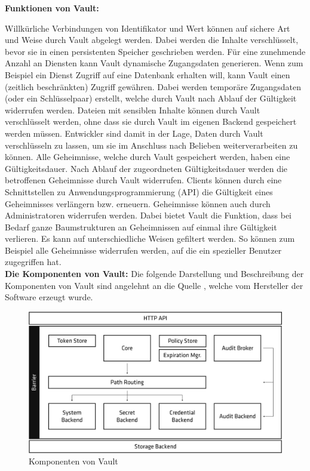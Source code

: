 \documentclass[
book,
a4paper,   
titlepage,  
halfparskip,
12pt        
]{scrartcl}
\begin{document}
\begin{onehalfspacing}
\textbf{Funktionen von Vault:}

Willkürliche Verbindungen von Identifikator und Wert können auf sichere Art und Weise durch Vault abgelegt werden. Dabei werden die Inhalte verschlüsselt, bevor sie in einen persistenten Speicher geschrieben werden.
Für eine zunehmende Anzahl an Diensten kann Vault dynamische Zugangsdaten generieren. Wenn zum Beispiel ein Dienst Zugriff auf eine Datenbank erhalten will, kann Vault einen (zeitlich beschränkten) Zugriff gewähren. Dabei werden temporäre Zugangsdaten (oder ein Schlüsselpaar) erstellt, welche durch Vault nach Ablauf der Gültigkeit widerrufen werden.
Dateien mit sensiblen Inhalte können durch Vault verschlüsselt werden, ohne dass sie durch Vault im eigenen Backend gespeichert werden müssen. Entwickler sind damit in der Lage, Daten durch Vault verschlüsseln zu lassen, um sie im Anschluss nach Belieben weiterverarbeiten zu können.\cite{vaultintro}\newline
Alle Geheimnisse, welche durch Vault gespeichert werden, haben eine Gültigkeitsdauer. Nach Ablauf der zugeordneten Gültigkeitsdauer werden die betroffenen Geheimnisse durch Vault widerrufen. Clients können durch eine Schnittstellen zu Anwendungsprogrammierung (API) die Gültigkeit eines Geheimnisses verlängern bzw. erneuern.
Geheimnisse können auch durch Administratoren widerrufen werden. Dabei bietet Vault die Funktion, dass bei Bedarf ganze Baumstrukturen an Geheimnissen auf einmal ihre Gültigkeit verlieren. Es kann auf unterschiedliche Weisen gefiltert werden. So können zum Beispiel alle Geheimnisse widerrufen werden, auf die ein spezieller Benutzer zugegriffen hat.\cite{vaultintro}\\

\textbf{Die Komponenten von Vault:}
Die folgende Darstellung und Beschreibung der Komponenten von Vault sind angelehnt an die Quelle \cite{vault}, welche vom Hersteller der Software erzeugt wurde. 

\begin{figure}[h]
	\centering
	\includegraphics[width=1\linewidth]{vault.png}
	\caption[Vault]{Komponenten von Vault\cite{vault}}
	\label{fig:vault}
\end{figure}


\end{onehalfspacing}
\end{document}
